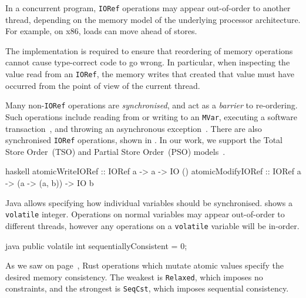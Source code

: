 \begin{displayquote}
  In a concurrent program, \verb|IORef| operations may appear out-of-order to
  another thread, depending on the memory model of the underlying processor
  architecture.  For example, on x86, loads can move ahead of stores.

  The implementation is required to ensure that reordering of memory operations
  cannot cause type-correct code to go wrong.  In particular, when inspecting
  the value read from an \verb|IORef|, the memory writes that created that value
  must have occurred from the point of view of the current thread.\cite{data_ioref}
\end{displayquote}

Many non-\verb|IORef| operations are \emph{synchronised}, and act as a
\emph{barrier} to re-ordering.  Such operations include reading from
or writing to an \verb|MVar|, executing a software
transaction~, and throwing an
asynchronous exception~.  There are also
synchronised \verb|IORef| operations, shown in
.  In our work, we support the Total Store
Order~(TSO)\cite{owens2009} and Partial Store Order~(PSO)\cite{sparc}
models~.

\begin{listing}
\centering
\begin{cminted}{haskell}
atomicWriteIORef  :: IORef a -> a -> IO ()
atomicModifyIORef :: IORef a -> (a -> (a, b)) -> IO b
\end{cminted}
\caption{Atomic operations in Haskell.}\label{lst:atomic_haskell}
\end{listing}

Java allows specifying how individual variables should be
synchronised.   shows a \verb|volatile| integer.
Operations on normal variables may appear out-of-order to different
threads, however any operations on a \verb|volatile| variable will be
in-order.

\begin{listing}
\centering
\begin{cminted}{java}
public volatile int sequentiallyConsistent = 0;
\end{cminted}
\caption{Atomic operations in Java.}\label{lst:atomic_java}
\end{listing}

As we saw on page~\pageref{page:rust_mem}, Rust operations which
mutate atomic values specify the desired memory consistency.  The
weakest is \verb|Relaxed|, which imposes no constraints, and the
strongest is \verb|SeqCst|, which imposes sequential consistency.

